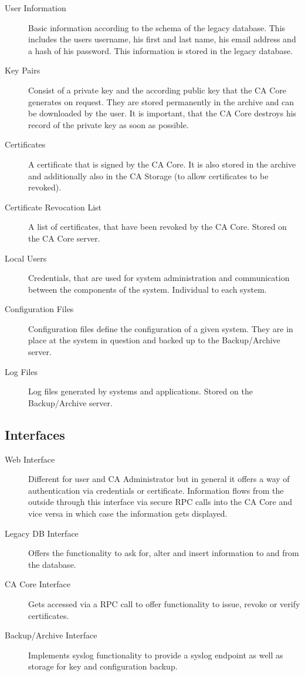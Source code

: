 \documentclass[a4paper, toc=index, 12pt, DIV14, twoside, BCOR2cm, headsepline, numbers=noenddot, bibliography=totoc]{scrbook}
\begin{document}
\begin{description}

\item[User Information] Basic information according to the schema of the legacy database. This includes the users username, his first and last name, his email address and a hash of his password. This information is stored in the legacy database.

\item[Key Pairs] Consist of a private key and the according public key that the CA Core generates on request. They are stored permanently in the archive and can be downloaded by the user. It is important, that the CA Core destroys his record of the private key as soon as possible.

\item[Certificates] A certificate that is signed by the CA Core. It is also stored in the archive and additionally also in the CA Storage (to allow certificates to be revoked).

\item[Certificate Revocation List] A list of certificates, that have been revoked by the CA Core. Stored on the CA Core server.

\item[Local Users] Credentials, that are used for system administration and communication between the components of the system. Individual to each system.

\item[Configuration Files] Configuration files define the configuration of a given system. They are in place at the system in question and backed up to the Backup/Archive server.

\item[Log Files] Log files generated by systems and applications. Stored on the Backup/Archive server.

\end{description}


\subsection{Interfaces}
\begin{description}

\item[Web Interface ]
Different for user and CA Administrator but in general it offers a way of authentication via credentials or certificate. Information flows from the outside through this interface via secure RPC calls into the CA Core and vice versa in which case the information gets displayed.

\item[Legacy DB Interface ]
Offers the functionality to ask for, alter and insert information to and from the database.

\item[CA Core Interface ]
Gets accessed via a RPC call to offer functionality to issue, revoke or verify certificates.

\item[Backup/Archive Interface ]
Implements syslog functionality to provide a syslog endpoint as well as storage for key and configuration backup.
\end{description}
\end{document}

